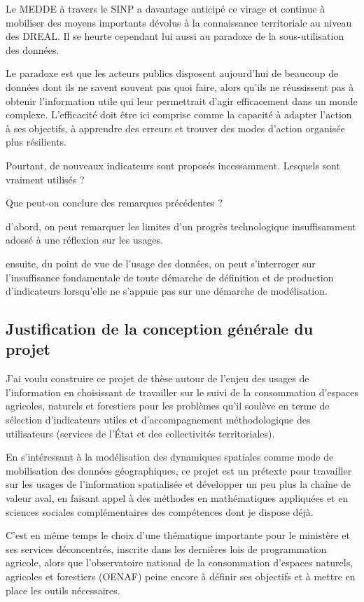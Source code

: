 Le MEDDE à travers le SINP a davantage anticipé ce virage
et continue à mobiliser des moyens importants dévolus à la connaissance
territoriale au niveau des DREAL. Il se heurte cependant lui aussi
au paradoxe de la sous-utilisation des données.

Le paradoxe est que les acteurs publics disposent aujourd'hui de beaucoup de données dont
ils ne savent souvent pas quoi faire, alors qu'ils ne
réussissent pas à obtenir l'information utile qui leur permettrait d'agir
efficacement dans un monde complexe. L'efficacité doit être
ici comprise comme la capacité à adapter l'action à ses objectifs, à apprendre
des erreurs et trouver des modes d'action organisée plus résilients.

Pourtant, de nouveaux indicateurs sont proposés incessamment.
Lesquels sont vraiment utilisés ?

Que peut-on conclure des remarques précédentes ?

\startitemize

\item d'abord, on peut remarquer les limites d'un progrès
      technologique insuffisamment adossé à une réflexion sur les usages.

\item ensuite, du point de vue de l'usage des données,
      on peut s'interroger sur l'insuffisance fondamentale
      de toute démarche de définition et de production
      d'indicateurs lorsqu'elle ne s'appuie pas sur une démarche
      de modélisation.

\stopitemize


\subsection
{Justification de la conception générale du projet}

J'ai voulu construire ce projet de thèse autour de
l'enjeu des usages de l'information en choisissant de
travailler sur le suivi de la consommation d'espaces agricoles,
naturels et forestiers pour les problèmes qu'il soulève en terme
de sélection d'indicateurs utiles et d'accompagnement méthodologique des utilisateurs
(services de l'État et des collectivités territoriales).

En s'intéressant à la modélisation des dynamiques spatiales comme mode de
mobilisation des données géographiques, ce projet est un prétexte pour
travailler sur les usages de l'information spatialisée et développer un peu
plus la chaîne de valeur aval, en faisant appel à des méthodes en
mathématiques appliquées et en sciences sociales complémentaires des
compétences dont je dispose déjà.

C'est en même temps le choix d'une thématique importante pour le ministère et
ses services déconcentrés, inscrite dans les dernières lois de programmation
agricole, alors que l'observatoire national de la consommation d'espaces
naturels, agricoles et forestiers (OENAF) peine encore à définir ses
objectifs et à mettre en place les outils nécessaires.